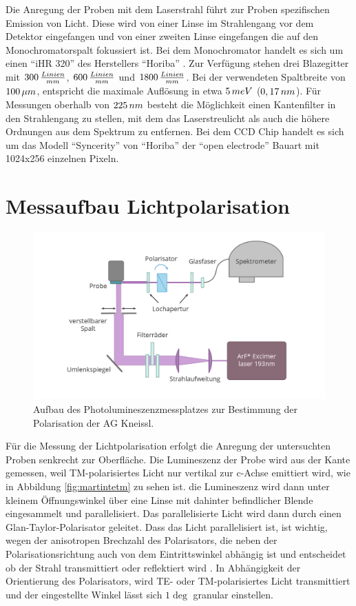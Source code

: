 Die Anregung der Proben mit dem Laserstrahl führt zur Proben spezifischen Emission von Licht. Diese wird von einer Linse im Strahlengang vor dem Detektor eingefangen und von einer zweiten Linse eingefangen die auf den Monochromatorspalt fokussiert ist.
Bei dem Monochromator handelt es sich um einen "`iHR 320"' des Herstellers "`Horiba"' . Zur Verfügung stehen drei Blazegitter mit $300 \thinspace \frac{Linien}{mm}$,
$600 \thinspace \frac{Linien}{mm}$ und $1800 \thinspace \frac{Linien}{mm}$. Bei der verwendeten Spaltbreite von $100 \thinspace \mu m$, entspricht die maximale Auflösung in etwa $5 \thinspace meV$ ($0,17 \thinspace nm$). Für Messungen oberhalb von $225 \thinspace nm$ besteht die Möglichkeit einen Kantenfilter in den Strahlengang zu stellen, mit dem das Laserstreulicht als auch die höhere Ordnungen aus dem Spektrum zu entfernen. Bei dem CCD Chip handelt es sich um das Modell "`Syncerity"' von "`Horiba"' der "`open electrode"' Bauart mit 1024x256 einzelnen Pixeln. 

\section{Messaufbau Lichtpolarisation}
\begin{figure}[!htb]
    \centering
    \begin{minipage}[t]{\linewidth}
        \centering
        \includegraphics[width=0.8\linewidth]{Bilder/aufbauPol.png}
        \caption{Aufbau des Photolumineszenzmessplatzes zur Bestimmung der Polarisation der AG Kneissl. }
        \label{fig:wurtz}
    \end{minipage}%
\end{figure}
\vspace{1cm}
\noindent
Für die Messung der Lichtpolarisation erfolgt die Anregung der untersuchten Proben senkrecht zur Oberfläche. Die Lumineszenz der Probe wird aus der Kante gemessen, weil TM-polarisiertes Licht nur vertikal zur c-Achse emittiert wird, wie in Abbildung \ref{fig:martintetm} zu sehen ist. die Lumineszenz wird dann unter kleinem Öffnungswinkel über eine Linse mit dahinter befindlicher Blende eingesammelt und parallelisiert. Das parallelisierte Licht wird dann durch einen Glan-Taylor-Polarisator geleitet. Dass das Licht parallelisiert ist, ist wichtig, wegen der anisotropen Brechzahl des Polarisators, die neben der Polarisationsrichtung auch von dem Eintrittswinkel abhängig ist und entscheidet ob der Strahl transmittiert oder reflektiert wird \cite{0950-7671-25-12-304}. In Abhängigkeit der Orientierung des Polarisators, wird TE- oder TM-polarisiertes Licht transmittiert und der eingestellte Winkel lässt sich $1\deg$ granular einstellen. 
